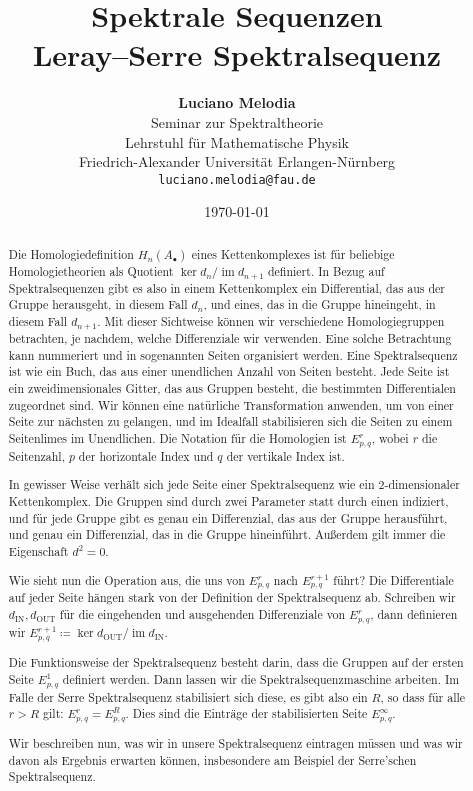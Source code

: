 \documentclass[12pt, hidelinks]{article}
\title{\textbf{Spektrale Sequenzen\\ Leray–Serre Spektralsequenz}}
\author{
\textbf{Luciano Melodia} \\
Seminar zur Spektraltheorie \\
Lehrstuhl für Mathematische Physik \\
Friedrich-Alexander Universität Erlangen-Nürnberg \\
\texttt{luciano.melodia@fau.de}}
\date{\today}
\numberwithin{conj}{section}
\newcommand{\ima}{\operatorname{im}}
\begin{document}
\hypersetup{bookmarksnumbered=true,}
\maketitle

\begin{abstract}
Die Homologiedefinition $H_n(A_\bullet)$ eines Kettenkomplexes ist für beliebige Homologietheorien als Quotient $\ker d_n/\ima d_{n+1}$ definiert. In Bezug auf Spektralsequenzen gibt es also in einem Kettenkomplex ein Differential, das aus der Gruppe herausgeht, in diesem Fall $d_n$, und eines, das in die Gruppe hineingeht, in diesem Fall $d_{n+1}$. Mit dieser Sichtweise können wir verschiedene Homologiegruppen betrachten, je nachdem, welche Differenziale wir verwenden. Eine solche Betrachtung kann nummeriert und in sogenannten Seiten organisiert werden. Eine Spektralsequenz ist wie ein Buch, das aus einer unendlichen Anzahl von Seiten besteht. Jede Seite ist ein zweidimensionales Gitter, das aus Gruppen besteht, die bestimmten Differentialen zugeordnet sind. Wir können eine natürliche Transformation anwenden, um von einer Seite zur nächsten zu gelangen, und im Idealfall stabilisieren sich die Seiten zu einem Seitenlimes im Unendlichen. Die Notation für die Homologien ist $E^r_{p,q}$, wobei $r$ die Seitenzahl, $p$ der horizontale Index und $q$ der vertikale Index ist.

In gewisser Weise verhält sich jede Seite einer Spektralsequenz wie ein $2$-dimensionaler Kettenkomplex. Die Gruppen sind durch zwei Parameter statt durch einen indiziert, und für jede Gruppe gibt es genau ein Differenzial, das aus der Gruppe herausführt, und genau ein Differenzial, das in die Gruppe hineinführt. Außerdem gilt immer die Eigenschaft $d^2 = 0$.

Wie sieht nun die Operation aus, die uns von $E^r_{p,q}$ nach $E^{r+1}_{p,q}$ führt? Die Differentiale auf jeder Seite hängen stark von der Definition der Spektralsequenz ab. Schreiben wir $d_{\operatorname{IN}},d_{\operatorname{OUT}}$ für die eingehenden und ausgehenden Differenziale von $E^r_{p,q}$, dann definieren wir $E^{r+1}_{p,q} \coloneq \ker d_{\operatorname{OUT}} / \ima d_{\operatorname{IN}}$.

Die Funktionsweise der Spektralsequenz besteht darin, dass die Gruppen auf der ersten Seite $E^1_{p,q}$ definiert werden. Dann lassen wir die Spektralsequenzmaschine arbeiten. Im Falle der Serre Spektralsequenz stabilisiert sich diese, es gibt also ein $R$, so dass für alle $r > R$ gilt: $E^r_{p,q} = E^R_{p,q}$. Dies sind die Einträge der stabilisierten Seite $E^\infty_{p,q}$.

Wir beschreiben nun, was wir in unsere Spektralsequenz eintragen müssen und was wir davon als Ergebnis erwarten können, insbesondere am Beispiel der Serre'schen Spektralsequenz.
\end{abstract}
\end{document}
